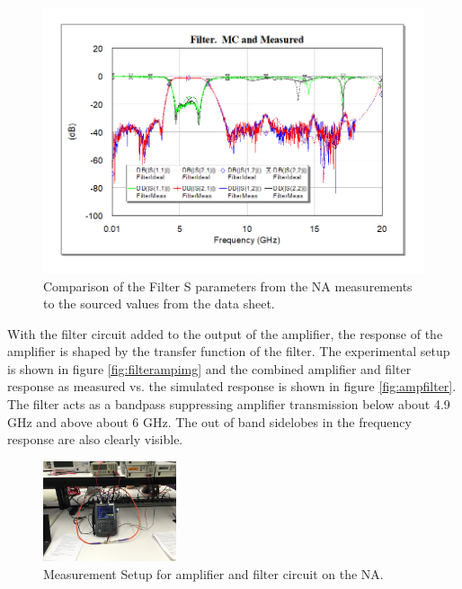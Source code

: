 \documentclass[twocolumn, aps, apl]{revtex4-1}
\begin{document}
\begin{figure}[!htbp]
    \centering
    \includegraphics[scale=0.45]{FilterMCandMeasured.png}
    \caption{Comparison of the Filter S parameters from the NA measurements to the sourced values from the data sheet.}
    \label{fig:filter}
\end{figure}

With the filter circuit added to the output of the amplifier, the response of the amplifier is shaped by the transfer function of the filter. The experimental setup is shown in figure \ref{fig:filterampimg} and the combined amplifier and filter response as measured vs. the simulated response is shown in figure \ref{fig:ampfilter}. The filter acts as a bandpass suppressing amplifier transmission below about 4.9 GHz and above about 6 GHz. The out of band sidelobes in the frequency response are also clearly visible.
\begin{figure}[!htbp]
    \centering
    \includegraphics[width=0.35\textwidth]{amp_and_filter_measurement.jpeg}
    \caption{Measurement Setup for amplifier and filter circuit on the NA.}
    \label{fig:filtampimg}
\end{figure}
\end{document}
